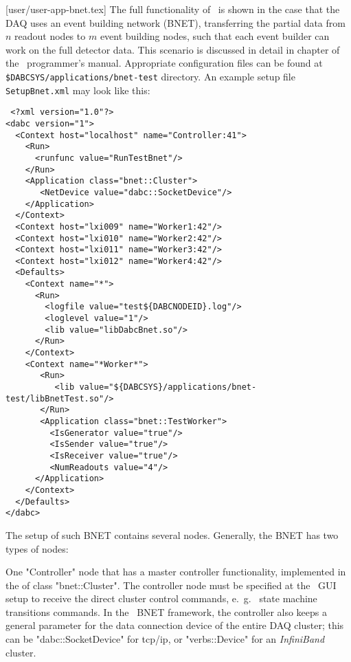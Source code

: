 [user/user-app-bnet.tex]
\label{user-app-bnet-chapter}
The full functionality of \dabc\ is shown in the case that the DAQ uses
an event building network (BNET), transferring the partial data from $n$ readout nodes
to $m$ event building nodes, such that each event builder can work on the full
detector data. This scenario is discussed in detail in chapter 
of the \dabc\ programmer's manual. Appropriate configuration files can be found at \\
{\tt \$DABCSYS/applications/bnet-test} directory.
An example setup file {\tt SetupBnet.xml} may look like this:

\begin{small}
\begin{verbatim}
 <?xml version="1.0"?>
<dabc version="1">
  <Context host="localhost" name="Controller:41">
    <Run>
      <runfunc value="RunTestBnet"/>
    </Run>
    <Application class="bnet::Cluster">
       <NetDevice value="dabc::SocketDevice"/>
    </Application>
  </Context>
  <Context host="lxi009" name="Worker1:42"/>
  <Context host="lxi010" name="Worker2:42"/>
  <Context host="lxi011" name="Worker3:42"/>
  <Context host="lxi012" name="Worker4:42"/>
  <Defaults>
    <Context name="*">
      <Run>
        <logfile value="test${DABCNODEID}.log"/>
        <loglevel value="1"/>
        <lib value="libDabcBnet.so"/>
      </Run>
    </Context>
    <Context name="*Worker*">
       <Run>
          <lib value="${DABCSYS}/applications/bnet-test/libBnetTest.so"/>
       </Run>
       <Application class="bnet::TestWorker">
         <IsGenerator value="true"/>
         <IsSender value="true"/>
         <IsReceiver value="true"/>
         <NumReadouts value="4"/>
      </Application>       
    </Context>
  </Defaults>
</dabc>
\end{verbatim}
\end{small}

The setup of such BNET contains several  nodes. Generally, the
BNET has two types of nodes: 
\bbul
\item One "Controller" node that has a master
controller functionality, implemented in the  of
class "bnet::Cluster". The controller node must be specified at the \dabc\ GUI setup
to receive the direct cluster control commands, e.~g.~ state machine transitions commands. In the \dabc\ BNET framework, the controller also keeps a general
parameter  for the data connection device of the entire DAQ cluster;
this can be "dabc::SocketDevice" for tcp/ip, or "verbs::Device" for an {\em InfiniBand}
cluster.

